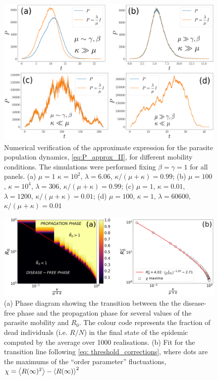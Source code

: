 \begin{figure}[H]
    \centering
    \includegraphics[width=\columnwidth]{Figures/P_approx.png}
    \caption{Numerical verification of the approximate expression for the
        parasite population dynamics, \cref{eq:P_approx_II}, for different
        mobility
        conditions. The simulations were performed fixing $\beta=\gamma=1$  for
        all
        panels. (a) $\mu=1$ $\kappa=10^2$, $\lambda=6.06$,
        $\kappa/(\mu+\kappa)=0.99$;
        (b) $\mu=100$, $\kappa=10^4$, $\lambda=306$,
        $\kappa/(\mu+\kappa)=0.99$; (c)
        $\mu=1$, $\kappa=0.01$, $\lambda=1200$, $\kappa/(\mu+\kappa)=0.01$; (d)
        $\mu=100$, $\kappa=1$, $\lambda=60600$,  $\kappa/(\mu+\kappa)=0.01$}
    \label{fig:P_approx}
\end{figure}

\begin{figure}[t!]
    \centering
    \includegraphics[width=1\textwidth]{Figures/PhaseDiagram.png}
    \caption{(a) Phase diagram showing the transition between the the
        disease-free phase and the propagation phase for several values of the
        parasite
        mobility and $R_0$. The colour code represents the fraction of dead
        individuals
        (i.e. $R/N$) in the final state of the epidemic computed by the average
        over
        1000 realisations. (b) Fit for the transition line following \cref{eq:
            threshold_corrections}, where dots are the maximums of the ``order
        parameter''
        fluctuations, $\chi=\left<{R(\infty})^2\right>-\left<R(\infty)\right>^2$}
    \label{fig:Phase_diagram}
\end{figure}

